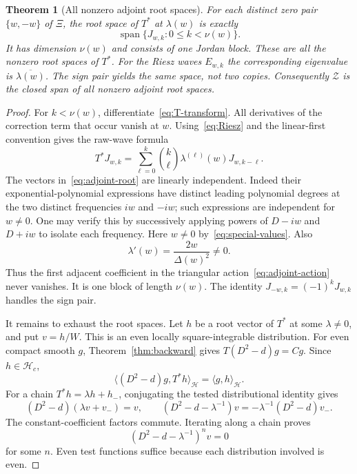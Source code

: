 \documentclass[11pt,a4paper]{article}
\numberwithin{equation}{section}
\newtheorem{theorem}{Theorem}[section]
\theoremstyle{definition}
\theoremstyle{remark}
\newcommand{\Hh}{\mathcal H}
\newcommand{\Zz}{\mathcal Z}
\newcommand{\ip}[2]{\langle #1,#2\rangle}
\begin{document}
\begin{theorem}[All nonzero adjoint root spaces]\label{thm:adjoint}
For each distinct zero pair $\{w,-w\}$ of $\Xi$, the root space of $T^*$ at $\lambda(w)$ is exactly
\begin{equation}\label{eq:adjoint-root}
 \operatorname{span}\{J_{w,k}:0\le k<\nu(w)\}.
\end{equation}
It has dimension $\nu(w)$ and consists of one Jordan block. These are all the nonzero root spaces of $T^*$. For the Riesz waves $E_{w,k}$ the corresponding eigenvalue is $\overline{\lambda(w)}$. The sign pair yields the same space, not two copies. Consequently $\Zz$ is the closed span of all nonzero adjoint root spaces.
\end{theorem}
\begin{proof}
For $k<\nu(w)$, differentiate~\eqref{eq:T-transform}. All derivatives of the correction term that occur vanish at $w$. Using~\eqref{eq:Riesz} and the linear-first convention gives the raw-wave formula
\begin{equation}\label{eq:adjoint-action}
 T^*J_{w,k}=\sum_{\ell=0}^k\binom{k}{\ell}
 \lambda^{(\ell)}(w)J_{w,k-\ell}.
\end{equation}
The vectors in~\eqref{eq:adjoint-root} are linearly independent. Indeed their exponential-polynomial expressions have distinct leading polynomial degrees at the two distinct frequencies $iw$ and $-iw$; such expressions are independent for $w\ne0$. One may verify this by successively applying powers of $D-iw$ and $D+iw$ to isolate each frequency. Here $w\ne0$ by~\eqref{eq:special-values}. Also
\[
 \lambda'(w)=\frac{2w}{\Delta(w)^2}\ne0.
\]
Thus the first adjacent coefficient in the triangular action~\eqref{eq:adjoint-action} never vanishes. It is one block of length $\nu(w)$. The identity $J_{-w,k}=(-1)^kJ_{w,k}$ handles the sign pair.

It remains to exhaust the root spaces. Let $h$ be a root vector of $T^*$ at some $\lambda\ne0$, and put $v=h/W$. This is an even locally square-integrable distribution. For even compact smooth $g$, Theorem~\ref{thm:backward} gives $T(D^2-d)g=Cg$. Since $h\in\Hh_c$,
\begin{equation}\label{eq:root-test}
 \ip{(D^2-d)g}{T^*h}_{\Hh}=\ip{g}{h}_{\Hh}.
\end{equation}
For a chain $T^*h=\lambda h+h_-$, conjugating the tested distributional identity gives
\[
 (D^2-d)(\lambda v+v_-)=v,
 \qquad (D^2-d-\lambda^{-1})v=-\lambda^{-1}(D^2-d)v_-.
\]
The constant-coefficient factors commute. Iterating along a chain proves
\begin{equation}\label{eq:root-ODE}
 (D^2-d-\lambda^{-1})^n v=0
\end{equation}
for some $n$. Even test functions suffice because each distribution involved is even.


\end{proof}
\end{document}
